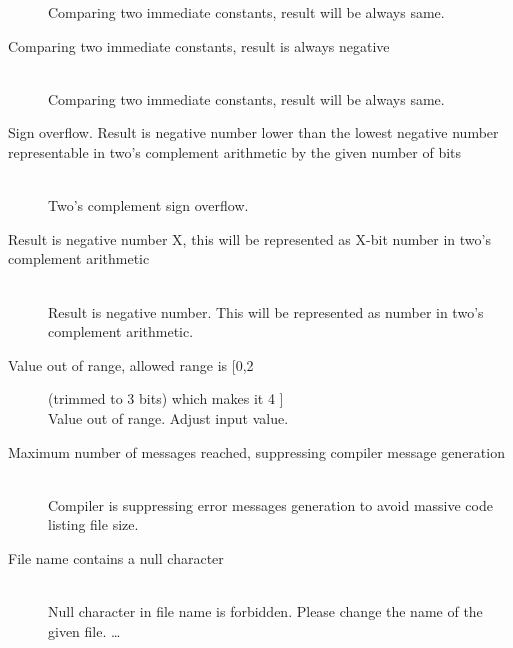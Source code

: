 \begin{description}
                    Comparing two immediate constants, result will be always same.
                    \item[Comparing two immediate constants, result is always negative] \hfill \\
                    Comparing two immediate constants, result will be always same.
                    \item[Sign overflow. Result is negative number lower than the lowest negative number representable in two's complement arithmetic by the given number of bits ] \hfill \\
                    Two's complement sign overflow.
                    \item[Result is negative number X, this will be represented as X-bit number in two's complement arithmetic] \hfill \\
                    Result is negative number. This will be represented as number in two's complement arithmetic.
                    \item[Value out of range, allowed range is [0,2] (trimmed to 3 bits) which makes it 4 ] \hfill \\
                    Value out of range. Adjust input value.
                    \item[Maximum number of messages reached, suppressing compiler message generation ] \hfill \\
                    Compiler is suppressing error messages generation to avoid massive code listing file size.
                    \item[File name contains a null character ] \hfill \\
                    Null character in file name is forbidden. Please change the name of the given file.
                    \ldots
                    \end{description}

